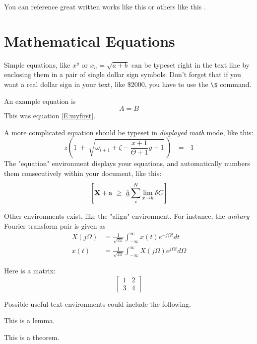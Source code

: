 \documentclass[12pt]{report}
\begin{document}
You can reference great written works like this \cite{ABC} or
others like this \cite{XYZ}.


\section {Mathematical Equations}
Simple equations, like $x^y$ or $x_n = \sqrt{a + b}$ can be typeset right
in the text line by enclosing them in a pair of single dollar sign symbols.
Don't forget that if you want a real dollar sign in your text, like \$2000,
you have to use the \verb+\$+ command.

An example equation is
\begin{equation} \label{E:myfirst}
A = B
\end{equation}
This was equation \eqref{E:myfirst}.

A more complicated equation should be typeset in {\em displayed math\/} mode,
like this:
\[
z \left( 1 \ +\ \sqrt{\omega_{i+1} + \zeta -\frac{x+1}{\Theta +1} y + 1} 
\ \right)
\ \ \ =\ \ \ 1
\]
The "equation" environment displays your equations, and automatically
numbers them consecutively within your document, like this:
\begin{equation}
\left[
{\bf X} + {\rm a} \ \geq\ 
\underline{\hat a} \sum_i^N \lim_{x \rightarrow k} \delta C
\right]
\end{equation}


Other environments exist, like the "align" environment.  For instance,
the {\em unitary} Fourier transform pair is given as
\begin{align}
X(j\Omega) &= \frac{1}{\sqrt{2\pi}} \int_{-\infty}^{\infty} x(t) e^{-j\Omega t} dt\\
x(t) &= \frac{1}{\sqrt{2\pi}} \int_{-\infty}^{\infty} X(j\Omega) e^{j\Omega t} d\Omega
\end{align}

Here is a matrix:
$$
\left[ \begin{matrix} 1 & 2 \\ 3 & 4 \end{matrix} \right]
$$


Possible useful text environments could include the following.

\begin{lemma} 
This is a lemma.
\end{lemma}

\begin{theorem} \label{T:my1}
This is a theorem.
\end{theorem}
\end{document}
